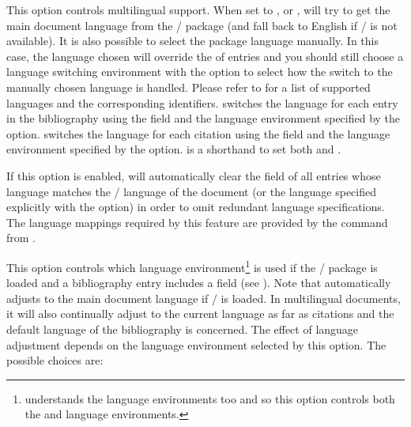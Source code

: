 \documentclass{ltxdockit}[2011/03/25]
\newcommand*{\biblatex}{\sty{biblatex}\xspace}
\begin{document}
\begin{optionlist}
This option controls multilingual support. When set to ,  or , \biblatex will try to get the main document language from the / package (and fall back to English if / is not available). It is also possible to select the package language manually. In this case, the language chosen will override the  of entries and you should still choose a language switching environment with the  option to select how the switch to the manually chosen language is handled. Please refer to  for a list of supported languages and the corresponding identifiers.  switches the language for each entry in the bibliography using the  field and the language environment specified by the  option.  switches the language for each citation using the  field and the language environment specified by the  option.  is a shorthand to set both  and .


If this option is enabled, \biblatex will automatically clear the  field of all entries whose language matches the / language of the document (or the language specified explicitly with the  option) in order to omit redundant language specifications. The language mappings required by this feature are provided by the  command from .


This option controls which  language environment\footnote{ understands the  language environments too and so this option controls both the  and  language environments.} is used if the / package is loaded and a bibliography entry includes a  field (see ). Note that \biblatex automatically adjusts to the main document language if / is loaded. In multilingual documents, it will also continually adjust to the current language as far as citations and the default language of the bibliography is concerned. The effect of language adjustment depends on the language environment selected by this option. The possible choices are:


\end{optionlist}
\end{document}
